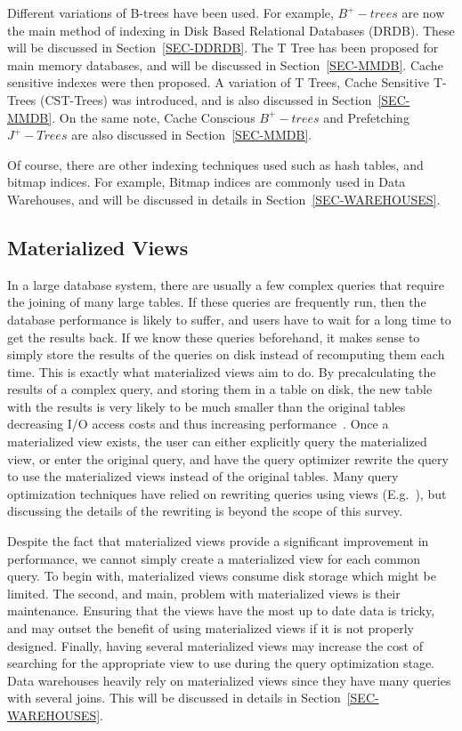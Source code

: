 \documentclass[12pt,a4paper]{article}
\begin{document}
Different variations of B-trees have been used. For example, $B^{+}-trees$ are now the main method of indexing in Disk Based Relational Databases (DRDB). These
will be discussed in Section~\ref{SEC-DDRDB}. The T Tree has been proposed for main memory databases, and will be discussed in Section~\ref{SEC-MMDB}. Cache
sensitive indexes were then proposed. A variation of T Trees, Cache Sensitive T-Trees (CST-Trees) was introduced, and is also discussed in
Section~\ref{SEC-MMDB}. On the same note, Cache Conscious $B^{+}-trees$ and Prefetching $J^{+}-Trees$ are also discussed in Section~\ref{SEC-MMDB}. 


Of course, there are other indexing techniques used such as hash tables, and bitmap indices. For example, Bitmap indices are commonly used in Data Warehouses,
and will be discussed in details in Section~\ref{SEC-WAREHOUSES}.


\subsection{Materialized Views}

In a large database system, there are usually a few complex queries that require the joining of many large tables. If these queries are frequently run, then the
database performance is likely to suffer, and users have to wait for a long time to get the results back. If we know these queries beforehand, it makes sense to
simply store the results of the queries on disk instead of recomputing them each time. This is exactly what materialized views aim to do. By precalculating the
results of a complex query, and storing them in a table on disk, the new table with the results is very likely to be much smaller than the original tables
decreasing I/O access costs and thus increasing performance~\cite{lightstone2007physical, chaudhuri1998overview}. Once a materialized view exists, the user can
either explicitly query the materialized view, or enter the original query, and have the query optimizer rewrite the query to use the materialized views instead
of the original tables. Many query optimization techniques have relied on rewriting queries using views (E.g.~\cite{levy1995answering, gupta1995aggregate,
goldstein2001optimizing,
abiteboul1998complexity}), but discussing the details of the rewriting is beyond the scope of this survey.


Despite the fact that materialized views provide a significant improvement in performance, we cannot simply create a materialized view for each common query. To
begin with, materialized views consume disk storage which might be limited. The second, and main, problem with materialized views is their maintenance. Ensuring
that the views have the most up to date data is tricky, and may outset the benefit of using materialized views if it is not properly designed. Finally, having
several materialized views may increase the cost of searching for the appropriate view to use during the query optimization stage. Data warehouses heavily rely
on materialized views since they have many queries with several joins. This will be discussed in details in Section~\ref{SEC-WAREHOUSES}.
\end{document}
